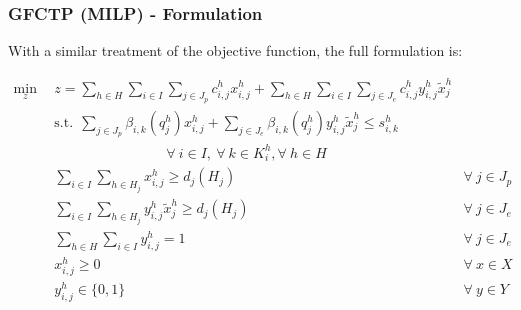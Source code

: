 \begin{frame}[ctb!]
  \frametitle{GFCTP (MILP) - Formulation} 
  
  With a similar treatment of the objective function, the full formulation is:

  \fontsize{7pt}{\baselineskip}\selectfont  
  \begin{subequations}\label{eqs:GFCTP-E}
    \begin{align}
      \label{eq:GRCTP-E_obj}
      \min_{z} \:\: 
      & 
      z = \sum_{h \in H}\sum_{i \in I}\sum_{j \in J_{p}}c_{i,j}^{h} x_{i,j}^{h} 
      + \sum_{h \in H}\sum_{i \in I}\sum_{j \in J_{e}}c_{i,j}^{h} y_{i,j}^{h} \tilde{x}_{j}^{h}
      && \\
      \label{eq:GRCTP-E_sup}
      &
      \text{s.t.} \:\: 
      \sum_{j \in J_{p}}\beta_{i,k}(q_{j}^{h}) x_{i,j}^{h}
      + \sum_{j \in J_{e}}\beta_{i,k}(q_{j}^{h}) y_{i,j}^{h} \tilde{x}_{j}^{h} \leq s_{i,k}^{h} \nonumber \\
      &
      \qquad\qquad\qquad\qquad
      \forall \: i \in I, \: \forall \: k \in K_{i}^{h}, \forall \: {h \in H}\\
      \label{eq:GRCTP-E_dem_p}
      &
      \sum_{i \in I}\sum_{h \in H_{j}} x_{i,j}^{h} \geq d_{j}(H_{j})
      &
      \forall \: j \in J_{p} &\\
      \label{eq:GRCTP-E_dem_e}
      &
      \sum_{i \in I}\sum_{h \in H_{j}} y_{i,j}^{h} \tilde{x}_{j}^{h} \geq d_{j}(H_{j}) 
      &
      \forall \: j \in J_{e}  &\\
      \label{eq:GRCTP-E_sumy}
      &
      \sum_{h \in H}\sum_{i \in I} y_{i,j}^{h} = 1
      &
      \forall \: j \in J_{e}  &\\
      \label{eq:GRCTP-E_x}
      &
      x_{i,j}^{h} \geq 0
      &
      \forall \: x \in X  &\\
      \label{eq:GRCTP-E_y}
      &
      y_{i,j}^{h} \in \{0,1\}
      &
      \forall \: y \in Y &
    \end{align}
  \end{subequations}

\end{frame}

